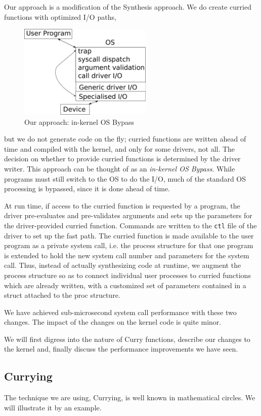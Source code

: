 \documentclass[letterpaper,twocolumn,10pt]{article}
\begin{document}
Our approach is a modification of the Synthesis approach. We do create curried functions with optimized I/O paths, 
\begin{figure}
\includegraphics[width=2.5in]{curry}
\caption{\label{curry}Our approach: in-kernel OS Bypass}
\end{figure}
but we do not generate code on the fly; curried functions are written ahead of time and compiled with the kernel, and only for some drivers, not all. The decision 
on whether to provide curried functions is determined by the driver writer. 
This approach can be thought of as an {\em in-kernel OS Bypass}. While programs must still switch to the OS to do the I/O, much of the standard OS processing is bypassed, since it is done ahead of time. 

At run time, if access to the curried function is requested by a program, 
the driver  pre-evaluates and pre-validates arguments and sets up the parameters for the driver-provided curried function. 
Commands are written to the {\tt ctl} file of the driver to set up the fast path. 
The 
curried function is made available to the user program as a private system call, i.e. the process structure for 
that one program is extended to hold the new system call number and parameters for the system call. 
Thus, instead of actually synthesizing code at runtime, we augment the process structure so as to 
connect individual user processes to curried 
functions which are already written, with a customized set of parameters contained in a struct attached to the proc structure. 

We have achieved sub-microsecond system call performance with these two changes. The impact of the 
changes on the kernel code is quite minor. 

We will first digress into the nature of Curry functions, describe our changes to the kernel and, finally discuss the 
performance improvements we have seen. 

\subsection{Currying}
The technique we are using, Currying, is well known in mathematical circles. 
We will illustrate it by an example. 
\end{document}
